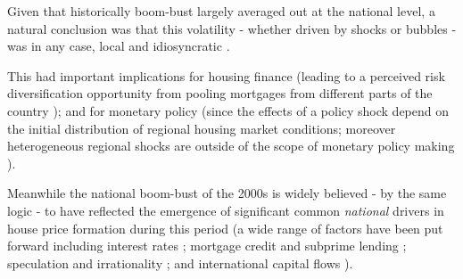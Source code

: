 \documentclass[11pt]{article}
\begin{document}
Given that historically boom-bust largely averaged out at the national level, a natural conclusion was that this volatility - whether driven by shocks or bubbles - was in any case, local and idiosyncratic \citep{DelNegro2007}.


This had important implications for housing finance (leading to a perceived risk diversification opportunity from pooling mortgages from different parts of the country \citep{BISCommitteeontheGlobalFinancialSystem2005,Coval2009,Cotter2015}); and for monetary policy (since the effects of a policy shock depend on the initial distribution of regional housing market conditions; moreover heterogeneous regional shocks are outside of the scope of monetary policy making \citep{DelNegro2007,Fratantoni2003}). %

Meanwhile the national boom-bust of the 2000s is widely believed - by the same logic - to have reflected the emergence of significant common \textit{national} drivers in house price formation during this period (a wide range of factors have been put forward including interest rates \citep{Campbell2009,Glaeser2013a,Himmelberg2005}; mortgage credit and subprime lending \citep{DellAriccia2012,Favilukis2016,Levitin2012,Mian2009,Pavlov2009,Wheaton2008}; speculation and irrationality \citep{Barlevy2011,Bayer2011,Bayer2016,Case2005,Case2003,Lee2011,Shiller2005,Wheaton2008, Burnside2016}; and international capital flows \citep{Favilukis2013,Favilukis2016}).%


\end{document}
